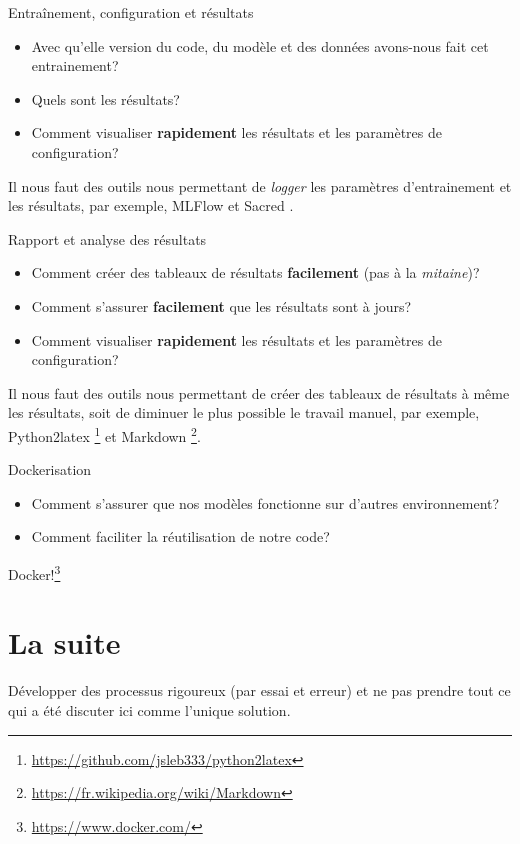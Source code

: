 \documentclass{beamer}
\begin{document}
	\begin{frame}{Entraînement, configuration et résultats}
		\begin{itemize}
			\item Avec qu'elle version du code, du modèle et des données avons-nous fait cet entrainement?
			\item Quels sont les résultats?
			\item Comment visualiser \textbf{rapidement} les résultats et les paramètres de configuration?
		\end{itemize}
		Il nous faut des outils nous permettant de \textit{logger} les paramètres d'entrainement et les résultats, par exemple, MLFlow \cite{Zaharia2018AcceleratingTM} et Sacred \cite{sacred}.
	\end{frame}

	\begin{frame}{Rapport et analyse des résultats}
		\begin{itemize}
			\item Comment créer des tableaux de résultats \textbf{facilement} (pas à la \textit{mitaine})?
			\item Comment s'assurer \textbf{facilement} que les résultats sont à jours?
			\item Comment visualiser \textbf{rapidement} les résultats et les paramètres de configuration?
		\end{itemize}
		Il nous faut des outils nous permettant de créer des tableaux de résultats à même les résultats, soit de diminuer le plus possible le travail manuel, par exemple, Python2latex \footnote{\url{https://github.com/jsleb333/python2latex}} et Markdown \footnote{\url{https://fr.wikipedia.org/wiki/Markdown}}.
	\end{frame}

	\begin{frame}{Dockerisation}
		\begin{itemize}
			\item Comment s'assurer que nos modèles fonctionne sur d'autres environnement?
			\item Comment faciliter la réutilisation de notre code?
		\end{itemize}
		Docker!\footnote{\url{https://www.docker.com/}}
	\end{frame}
	
	
	
	\section{La suite}
	\begin{frame}
		Développer des processus rigoureux (par essai et erreur) et ne pas prendre tout ce qui a été discuter ici comme l'unique solution.
	\end{frame}
\end{document}
